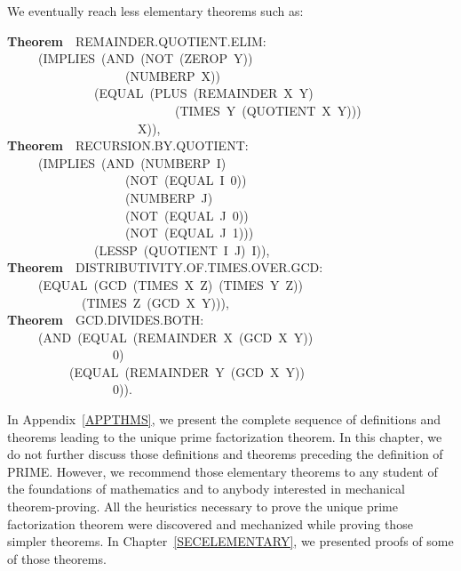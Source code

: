 \documentclass[10pt]{book}
\newenvironment{pubasis}{\begin{flushleft}}{\end{flushleft}}
\newcommand{\axiomordefinition}[1]{\vspace{6pt}\Large\textsf{\textbf{#1}}\normalsize}
\begin{document}
We eventually reach less elementary theorems such as:
\begin{pubasis}
\axiomordefinition{Theorem}~~REMAINDER.QUOTIENT.ELIM:\\
~~~~~(IMPLIES~(AND~(NOT~(ZEROP~Y))\\
~~~~~~~~~~~~~~~~~~~(NUMBERP~X))\\
~~~~~~~~~~~~~~(EQUAL~(PLUS~(REMAINDER~X~Y)\\
~~~~~~~~~~~~~~~~~~~~~~~~~~~(TIMES~Y~(QUOTIENT~X~Y)))\\
~~~~~~~~~~~~~~~~~~~~~X)),\\

\axiomordefinition{Theorem}~~RECURSION.BY.QUOTIENT:\\
~~~~~(IMPLIES~(AND~(NUMBERP~I)\\
~~~~~~~~~~~~~~~~~~~(NOT~(EQUAL~I~0))\\
~~~~~~~~~~~~~~~~~~~(NUMBERP~J)\\
~~~~~~~~~~~~~~~~~~~(NOT~(EQUAL~J~0))\\
~~~~~~~~~~~~~~~~~~~(NOT~(EQUAL~J~1)))\\
~~~~~~~~~~~~~~(LESSP~(QUOTIENT~I~J)~I)),\\

\axiomordefinition{Theorem}~~DISTRIBUTIVITY.OF.TIMES.OVER.GCD:\\
~~~~~(EQUAL~(GCD~(TIMES~X~Z)~(TIMES~Y~Z))\\
~~~~~~~~~~~~(TIMES~Z~(GCD~X~Y))),\\

\axiomordefinition{Theorem}~~GCD.DIVIDES.BOTH:\\
~~~~~(AND~(EQUAL~(REMAINDER~X~(GCD~X~Y))\\
~~~~~~~~~~~~~~~~~0)\\
~~~~~~~~~~(EQUAL~(REMAINDER~Y~(GCD~X~Y))\\
~~~~~~~~~~~~~~~~~0)).\\
\end{pubasis}
In Appendix~\ref{APPTHMS}, we present the complete sequence of definitions
and theorems leading to the unique prime factorization theorem.
In this chapter, we do not further discuss
those definitions and theorems preceding the definition of PRIME.
However, we recommend those elementary theorems to any student
of the foundations of mathematics and to anybody interested in
mechanical theorem-proving.  All the heuristics
necessary to prove the unique prime factorization theorem were discovered
and mechanized while proving those simpler theorems.  In Chapter~\ref{SECELEMENTARY},
we presented proofs of some of those theorems.
\end{document}

